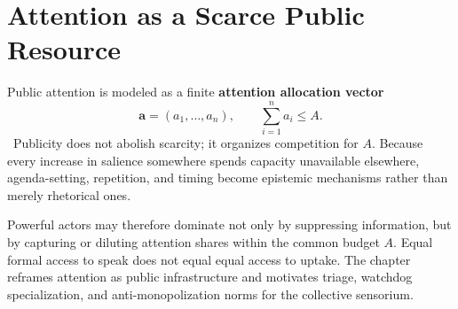 
\chapter{Attention as a Scarce Public Resource}
\label{ch:ch025}

Public attention is modeled as a finite \textbf{attention allocation vector}
\[
\mathbf a=(a_1,\ldots,a_n),
\qquad
\sum_{i=1}^{n} a_i \leq A.
\]
\Definition\ Publicity does not abolish scarcity; it organizes competition for \(A\). Because every increase in salience somewhere spends capacity unavailable elsewhere, agenda-setting, repetition, and timing become epistemic mechanisms rather than merely rhetorical ones.

Powerful actors may therefore dominate not only by suppressing information, but by capturing or diluting attention shares within the common budget \(A\). Equal formal access to speak does not equal equal access to uptake. The chapter reframes attention as public infrastructure and motivates triage, watchdog specialization, and anti-monopolization norms for the collective sensorium.
